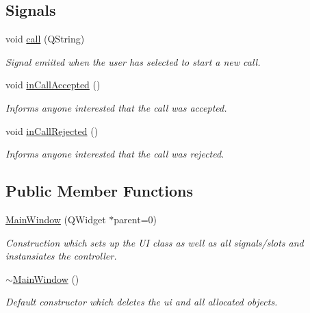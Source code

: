 \subsection*{\-Signals}
\begin{DoxyCompactItemize}
\item 
void \hyperlink{class_main_window_aea2d395eaa1a1b353b7838731595a3f7}{call} (\-Q\-String)
\begin{DoxyCompactList}\small\item\em \-Signal emiited when the user has selected to start a new call. \end{DoxyCompactList}\item 
void \hyperlink{class_main_window_ac1ad769a26f328f8184cd63833af4539}{in\-Call\-Accepted} ()
\begin{DoxyCompactList}\small\item\em \-Informs anyone interested that the call was accepted. \end{DoxyCompactList}\item 
void \hyperlink{class_main_window_a3322ffd0516e30afc70f8b623301c426}{in\-Call\-Rejected} ()
\begin{DoxyCompactList}\small\item\em \-Informs anyone interested that the call was rejected. \end{DoxyCompactList}\end{DoxyCompactItemize}
\subsection*{\-Public \-Member \-Functions}
\begin{DoxyCompactItemize}
\item 
\hyperlink{class_main_window_a8b244be8b7b7db1b08de2a2acb9409db}{\-Main\-Window} (\-Q\-Widget $\ast$parent=0)
\begin{DoxyCompactList}\small\item\em \-Construction which sets up the \-U\-I class as well as all signals/slots and instansiates the controller. \end{DoxyCompactList}\item 
\hyperlink{class_main_window_ae98d00a93bc118200eeef9f9bba1dba7}{$\sim$\-Main\-Window} ()
\begin{DoxyCompactList}\small\item\em \-Default constructor which deletes the ui and all allocated objects. \end{DoxyCompactList}\end{DoxyCompactItemize}
